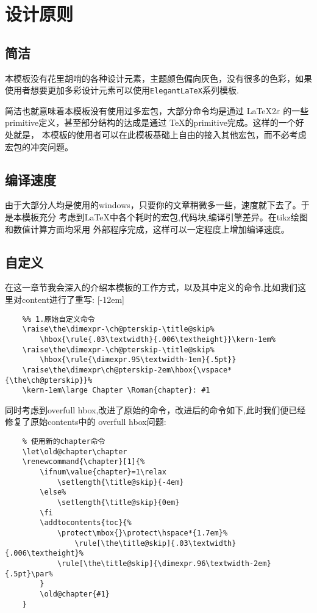 \documentclass[lang=cn, math=mathptmx]{ZLaTeX}
\begin{document}
\section{设计原则}
\subsection{简洁}
本模板没有花里胡哨的各种设计元素，主题颜色偏向灰色，没有很多的色彩，如果
使用者想要更加多彩设计元素可以使用\verb|ElegantLaTeX|系列模板.

简洁也就意味着本模板没有使用过多宏包，大部分命令均是通过 \LaTeX2$\varepsilon{}$ 的一些
primitive定义，甚至部分结构的达成是通过 \TeX{}的primitive完成。这样的一个好处就是，
本模板的使用者可以在此模板基础上自由的接入其他宏包，而不必考虑宏包的冲突问题。


\subsection{编译速度}
由于大部分人均是使用的windows，只要你的文章稍微多一些，速度就下去了。于是本模板充分
考虑到\LaTeX{}中各个耗时的宏包,代码块,编译引擎差异。在tikz绘图和数值计算方面均采用
外部程序完成，这样可以一定程度上增加编译速度。


\subsection{自定义}
在这一章节我会深入的介绍本模板的工作方式，以及其中定义的命令.比如我们这里对content进行了重写:
[-12em]

\begin{verbatim}
    %% 1.原始自定义命令
    \raise\the\dimexpr-\ch@pterskip-\title@skip%
        \hbox{\rule{.03\textwidth}{.006\textheight}}\kern-1em%
    \raise\the\dimexpr-\ch@pterskip-\title@skip%
        \hbox{\rule{\dimexpr.95\textwidth-1em}{.5pt}}
    \raise\the\dimexpr\ch@pterskip-2em\hbox{\vspace*{\the\ch@pterskip}}%
    \kern-1em\large Chapter \Roman{chapter}: #1
\end{verbatim}


同时考虑到overfull hbox,改进了原始的命令，改进后的命令如下,此时我们便已经修复了原始contents中的
overfull hbox问题:
\begin{verbatim}
    % 使用新的chapter命令
    \let\old@chapter\chapter
    \renewcommand{\chapter}[1]{%
        \ifnum\value{chapter}=1\relax
            \setlength{\title@skip}{-4em}
        \else%
            \setlength{\title@skip}{0em}
        \fi
        \addtocontents{toc}{%
            \protect\mbox{}\protect\hspace*{1.7em}%
                \rule[\the\title@skip]{.03\textwidth}{.006\textheight}%
            \rule[\the\title@skip]{\dimexpr.96\textwidth-2em}{.5pt}\par%
        }
        \old@chapter{#1}
    }
\end{verbatim}
\end{document}
